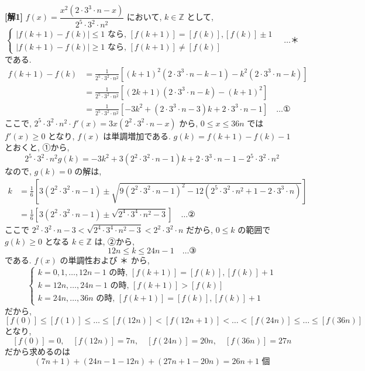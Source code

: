 \documentclass[../main.tex]{subfiles}
\begin{document}
\noindent
\textbf{[解1]} $f(x) = \dfrac{x^2(2 \cdot 3^3 \cdot n - x)}{2^5 \cdot 3^2 \cdot n^2}$ において, $k \in \mathbb{Z}$ として,
\[
  \begin{cases}
    |f(k+1) - f(k)| \le 1 \text{ なら, } [f(k+1)] = [f(k)], [f(k)] \pm 1 \\
    |f(k+1) - f(k)| \ge 1 \text{ なら, } [f(k+1)] \neq [f(k)]
  \end{cases}
  \quad \dots \text{＊}
\]
である.
\begin{align*}
  f(k+1) - f(k) &= \frac{1}{2^5 \cdot 3^2 \cdot n^2} \left[ (k+1)^2(2 \cdot 3^3 \cdot n - k - 1) - k^2(2 \cdot 3^3 \cdot n - k) \right] \\
  &= \frac{1}{2^5 \cdot 3^2 \cdot n^2} \left[ (2k+1)(2 \cdot 3^3 \cdot n - k) - (k+1)^2 \right] \\
  &= \frac{1}{2^5 \cdot 3^2 \cdot n^2} \left[ -3k^2 + (2 \cdot 3^3 \cdot n - 3)k + 2 \cdot 3^3 \cdot n - 1 \right] \quad \dots \text{①}
\end{align*}
ここで, $2^5 \cdot 3^2 \cdot n^2 \cdot f'(x) = 3x(2^2 \cdot 3^2 \cdot n - x)$ から, $0 \le x \le 36n$ では $f'(x) \ge 0$ となり, $f(x)$ は単調増加である. $g(k) = f(k+1) - f(k) - 1$ とおくと, ①から,
\[
  2^5 \cdot 3^2 \cdot n^2 g(k) = -3k^2 + 3(2^2 \cdot 3^2 \cdot n - 1)k + 2 \cdot 3^3 \cdot n - 1 - 2^5 \cdot 3^2 \cdot n^2
\]
なので, $g(k) = 0$ の解は,
\begin{align*}
  k &= \frac{1}{6} \left[ 3(2^2 \cdot 3^2 \cdot n - 1) \pm \sqrt{9(2^2 \cdot 3^2 \cdot n - 1)^2 - 12\left(2^5 \cdot 3^2 \cdot n^2 + 1 - 2 \cdot 3^3 \cdot n\right)} \right] \\
  &= \frac{1}{6} \left[ 3(2^2 \cdot 3^2 \cdot n - 1) \pm \sqrt{2^4 \cdot 3^4 \cdot n^2 - 3} \right] \quad \dots \text{②}
\end{align*}
ここで $2^2 \cdot 3^2 \cdot n - 3 < \sqrt{2^4 \cdot 3^4 \cdot n^2 - 3} < 2^2 \cdot 3^2 \cdot n$ だから, $0 \le k$ の範囲で $g(k) \ge 0$ となる $k \in \mathbb{Z}$ は, ②から,
\[
  12n \le k \le 24n - 1 \quad \dots \text{③}
\]
である. $f(x)$ の単調性および ＊ から,
\[
  \begin{cases}
    k = 0, 1, \dots, 12n-1 \text{ の時, } [f(k+1)] = [f(k)], [f(k)] + 1 \\
    k = 12n, \dots, 24n-1 \text{ の時, } [f(k+1)] > [f(k)] \\
    k = 24n, \dots, 36n \text{ の時, } [f(k+1)] = [f(k)], [f(k)] + 1
  \end{cases}
\]
だから,
\[
  [f(0)] \le [f(1)] \le \dots \le [f(12n)] < [f(12n+1)] < \dots < [f(24n)] \le \dots \le [f(36n)]
\]
となり,
\[
  [f(0)] = 0, \quad [f(12n)] = 7n, \quad [f(24n)] = 20n, \quad [f(36n)] = 27n
\]
だから求めるのは
\[
  (7n + 1) + (24n - 1 - 12n) + (27n + 1 - 20n) = 26n + 1 \text{ 個}
\]
\end{document}
